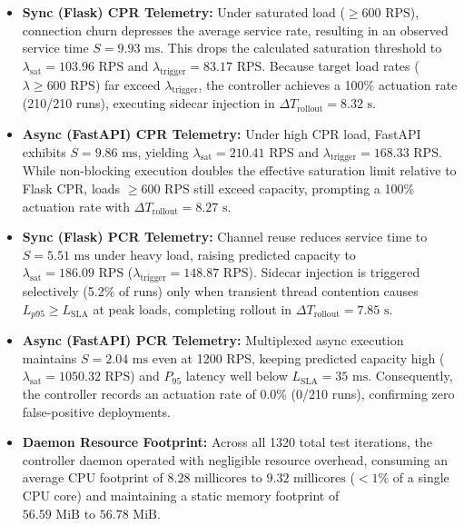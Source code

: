 \documentclass{ieeeaccess}
\begin{document}
	\begin{itemize}
		\item \textbf{Sync (Flask) CPR Telemetry:} Under saturated load ($\ge 600\text{ RPS}$), connection churn depresses the average service rate, resulting in an observed service time $S = 9.93\text{ ms}$. This drops the calculated saturation threshold to $\lambda_{\text{sat}} = 103.96\text{ RPS}$ and $\lambda_{\text{trigger}} = 83.17\text{ RPS}$. Because target load rates ($\lambda \ge 600\text{ RPS}$) far exceed $\lambda_{\text{trigger}}$, the controller achieves a 100\% actuation rate (210/210 runs), executing sidecar injection in $\Delta T_{\text{rollout}} = 8.32\text{ s}$.
		
		\item \textbf{Async (FastAPI) CPR Telemetry:} Under high CPR load, FastAPI exhibits $S = 9.86\text{ ms}$, yielding $\lambda_{\text{sat}} = 210.41\text{ RPS}$ and $\lambda_{\text{trigger}} = 168.33\text{ RPS}$. While non-blocking execution doubles the effective saturation limit relative to Flask CPR, loads $\ge 600\text{ RPS}$ still exceed capacity, prompting a 100\% actuation rate with $\Delta T_{\text{rollout}} = 8.27\text{ s}$.
		
		\item \textbf{Sync (Flask) PCR Telemetry:} Channel reuse reduces service time to $S = 5.51\text{ ms}$ under heavy load, raising predicted capacity to $\lambda_{\text{sat}} = 186.09\text{ RPS}$ ($\lambda_{\text{trigger}} = 148.87\text{ RPS}$). Sidecar injection is triggered selectively (5.2\% of runs) only when transient thread contention causes $L_{p95} \ge L_{\text{SLA}}$ at peak loads, completing rollout in $\Delta T_{\text{rollout}} = 7.85\text{ s}$.
		
		\item \textbf{Async (FastAPI) PCR Telemetry:} Multiplexed async execution maintains $S = 2.04\text{ ms}$ even at 1200 RPS, keeping predicted capacity high ($\lambda_{\text{sat}} = 1050.32\text{ RPS}$) and $P_{95}$ latency well below $L_{\text{SLA}} = 35\text{ ms}$. Consequently, the controller records an actuation rate of 0.0\% (0/210 runs), confirming zero false-positive deployments.
		
		\item \textbf{Daemon Resource Footprint:} Across all 1320 total test iterations, the controller daemon operated with negligible resource overhead, consuming an average CPU footprint of $8.28\text{ millicores } \text{to } 9.32\text{ millicores}$ ($< 1\%$ of a single CPU core) and maintaining a static memory footprint of $56.59\text{ MiB } \text{to } 56.78\text{ MiB}$.
	\end{itemize}
	
\end{document}
